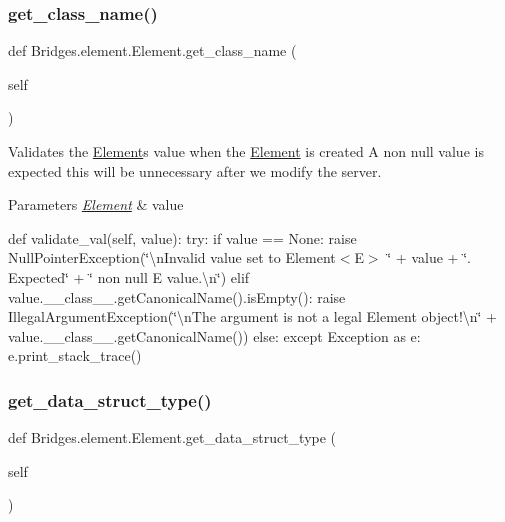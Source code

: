 \subsubsection{\texorpdfstring{get\+\_\+class\+\_\+name()}{get\_class\_name()}}
{\footnotesize\ttfamily def Bridges.\+element.\+Element.\+get\+\_\+class\+\_\+name (\begin{DoxyParamCaption}\item[{}]{self }\end{DoxyParamCaption})}



Validates the \mbox{\hyperlink{class_bridges_1_1element_1_1_element}{Element}}\textquotesingle{}s value when the \mbox{\hyperlink{class_bridges_1_1element_1_1_element}{Element}} is created A non null value is expected this will be unnecessary after we modify the server. 


\begin{DoxyParams}{Parameters}
{\em \mbox{\hyperlink{class_bridges_1_1element_1_1_element}{Element}}} & value\\
\hline
\end{DoxyParams}
def validate\+\_\+val(self, value)\+: try\+: if value == None\+: raise Null\+Pointer\+Exception(\char`\"{}\textbackslash{}n\+Invalid value set to Element$<$\+E$>$ \textquotesingle{}\char`\"{} + value + \char`\"{}\textquotesingle{}. Expected\char`\"{} + \char`\"{} non null E value.\textbackslash{}n\char`\"{}) elif value.\+\_\+\+\_\+class\+\_\+\+\_\+.\+get\+Canonical\+Name().is\+Empty()\+: raise Illegal\+Argument\+Exception(\char`\"{}\textbackslash{}n\+The argument is not a legal Element object!\textbackslash{}n\char`\"{} + value.\+\_\+\+\_\+class\+\_\+\+\_\+.\+get\+Canonical\+Name()) else\+: except Exception as e\+: e.\+print\+\_\+stack\+\_\+trace() \mbox{\label{class_bridges_1_1element_1_1_element_aeb25959809a6c89fa7a1fcb55378e751}} 
\subsubsection{\texorpdfstring{get\+\_\+data\+\_\+struct\+\_\+type()}{get\_data\_struct\_type()}}
{\footnotesize\ttfamily def Bridges.\+element.\+Element.\+get\+\_\+data\+\_\+struct\+\_\+type (\begin{DoxyParamCaption}\item[{}]{self }\end{DoxyParamCaption})}

